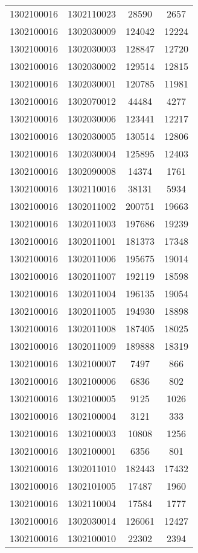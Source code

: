 \begin{longtable}[h]{llcc}
		1302100016 & 1302110023 & 28590 & 2657\\
		1302100016 & 1302030009 & 124042 & 12224\\
		1302100016 & 1302030003 & 128847 & 12720\\
		1302100016 & 1302030002 & 129514 & 12815\\
		1302100016 & 1302030001 & 120785 & 11981\\
		1302100016 & 1302070012 & 44484 & 4277\\
		1302100016 & 1302030006 & 123441 & 12217\\
		1302100016 & 1302030005 & 130514 & 12806\\
		1302100016 & 1302030004 & 125895 & 12403\\
		1302100016 & 1302090008 & 14374 & 1761\\
		1302100016 & 1302110016 & 38131 & 5934\\
		1302100016 & 1302011002 & 200751 & 19663\\
		1302100016 & 1302011003 & 197686 & 19239\\
		1302100016 & 1302011001 & 181373 & 17348\\
		1302100016 & 1302011006 & 195675 & 19014\\
		1302100016 & 1302011007 & 192119 & 18598\\
		1302100016 & 1302011004 & 196135 & 19054\\
		1302100016 & 1302011005 & 194930 & 18898\\
		1302100016 & 1302011008 & 187405 & 18025\\
		1302100016 & 1302011009 & 189888 & 18319\\
		1302100016 & 1302100007 & 7497 & 866\\
		1302100016 & 1302100006 & 6836 & 802\\
		1302100016 & 1302100005 & 9125 & 1026\\
		1302100016 & 1302100004 & 3121 & 333\\
		1302100016 & 1302100003 & 10808 & 1256\\
		1302100016 & 1302100001 & 6356 & 801\\
		1302100016 & 1302011010 & 182443 & 17432\\
		1302100016 & 1302101005 & 17487 & 1960\\
		1302100016 & 1302110004 & 17584 & 1777\\
		1302100016 & 1302030014 & 126061 & 12427\\
		1302100016 & 1302100010 & 22302 & 2394\\

\end{longtable}
